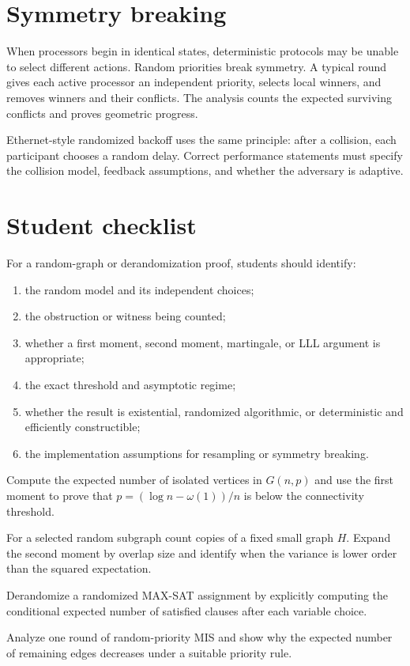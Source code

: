 \section{Symmetry breaking}

When processors begin in identical states, deterministic protocols may be
unable to select different actions.  Random priorities break symmetry.  A
typical round gives each active processor an independent priority, selects
local winners, and removes winners and their conflicts.  The analysis counts
the expected surviving conflicts and proves geometric progress.

Ethernet-style randomized backoff uses the same principle: after a collision,
each participant chooses a random delay.  Correct performance statements
must specify the collision model, feedback assumptions, and whether the
adversary is adaptive.

\section{Student checklist}

For a random-graph or derandomization proof, students should identify:

\begin{enumerate}
\item the random model and its independent choices;
\item the obstruction or witness being counted;
\item whether a first moment, second moment, martingale, or LLL argument is
      appropriate;
\item the exact threshold and asymptotic regime;
\item whether the result is existential, randomized algorithmic, or
      deterministic and efficiently constructible;
\item the implementation assumptions for resampling or symmetry breaking.
\end{enumerate}

\begin{problem}
Compute the expected number of isolated vertices in $G(n,p)$ and use the
first moment to prove that $p=(\log n-\omega(1))/n$ is below the connectivity
threshold.
\end{problem}

\begin{problem}
For a selected random subgraph count copies of a fixed small graph $H$.
Expand the second moment by overlap size and identify when the variance is
lower order than the squared expectation.
\end{problem}

\begin{problem}
Derandomize a randomized MAX-SAT assignment by explicitly computing the
conditional expected number of satisfied clauses after each variable choice.
\end{problem}

\begin{problem}
Analyze one round of random-priority MIS and show why the expected number of
remaining edges decreases under a suitable priority rule.
\end{problem}
